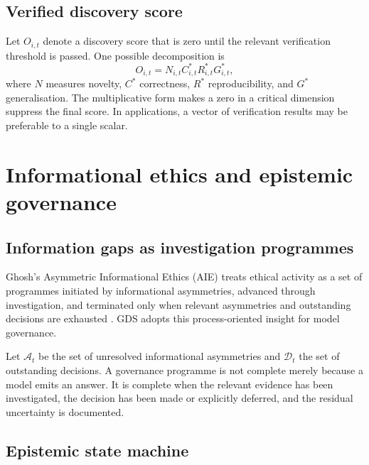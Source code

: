 \documentclass[11pt,a4paper]{article}
\begin{document}
\subsection{Verified discovery score}

Let \(O_{i,t}\) denote a discovery score that is zero until the relevant verification threshold is passed. One possible decomposition is
\begin{equation}
O_{i,t}
=
N_{i,t}C_{i,t}^{*}R_{i,t}^{*}G_{i,t}^{*},
\end{equation}
where \(N\) measures novelty, \(C^*\) correctness, \(R^*\) reproducibility, and \(G^*\) generalisation. The multiplicative form makes a zero in a critical dimension suppress the final score. In applications, a vector of verification results may be preferable to a single scalar.

\section{Informational ethics and epistemic governance}

\subsection{Information gaps as investigation programmes}

Ghosh's Asymmetric Informational Ethics (AIE) treats ethical activity as a set of programmes initiated by informational asymmetries, advanced through investigation, and terminated only when relevant asymmetries and outstanding decisions are exhausted \cite{ghosh2026aie}. GDS adopts this process-oriented insight for model governance.

Let \(\mathcal A_t\) be the set of unresolved informational asymmetries and \(\mathcal D_t\) the set of outstanding decisions. A governance programme is not complete merely because a model emits an answer. It is complete when the relevant evidence has been investigated, the decision has been made or explicitly deferred, and the residual uncertainty is documented.

\subsection{Epistemic state machine}
\end{document}
